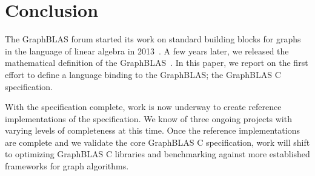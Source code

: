 \section{Conclusion}
\label{sec:conclusion}

The GraphBLAS forum started its work on standard building blocks for 
graphs in the language of linear algebra in 2013~\cite{hpec13}.  A few
years later, we released the mathematical
definition of the GraphBLAS~\cite{mathgraphblas16}.
In this paper, we report on the first effort to define a language binding
to the GraphBLAS; the GraphBLAS C specification.

With the specification complete, work is now underway to create 
reference implementations of the specification.  We know of three 
ongoing projects with varying levels of completeness at this time.   
Once the reference implementations are complete and we validate
the core GraphBLAS C specification, work will shift to optimizing
GraphBLAS C libraries and benchmarking against more established
frameworks for graph algorithms. 
